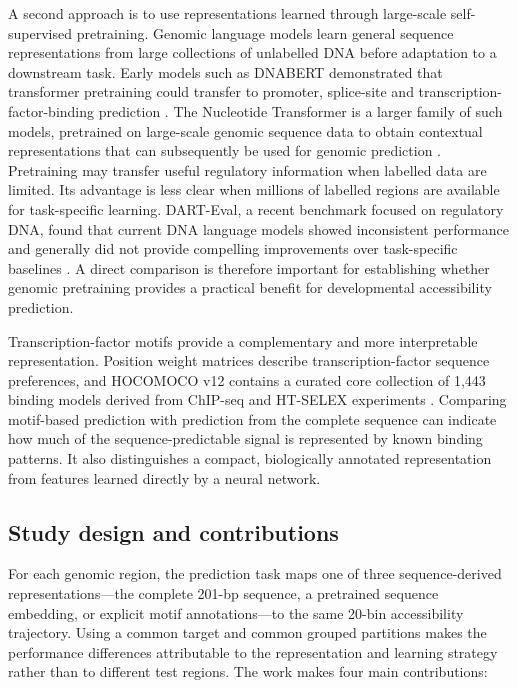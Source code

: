\documentclass[a4paper,12pt]{article}
\begin{document}
A second approach is to use representations learned through large-scale self-supervised pretraining. Genomic language models learn general sequence representations from large collections of unlabelled DNA before adaptation to a downstream task. Early models such as DNABERT demonstrated that transformer pretraining could transfer to promoter, splice-site and transcription-factor-binding prediction \citep{ji2021dnabert}. The Nucleotide Transformer is a larger family of such models, pretrained on large-scale genomic sequence data to obtain contextual representations that can subsequently be used for genomic prediction \citep{dallatorre2024nt}. Pretraining may transfer useful regulatory information when labelled data are limited. Its advantage is less clear when millions of labelled regions are available for task-specific learning. DART-Eval, a recent benchmark focused on regulatory DNA, found that current DNA language models showed inconsistent performance and generally did not provide compelling improvements over task-specific baselines \citep{patel2024darteval}. A direct comparison is therefore important for establishing whether genomic pretraining provides a practical benefit for developmental accessibility prediction.

Transcription-factor motifs provide a complementary and more interpretable representation. Position weight matrices describe transcription-factor sequence preferences, and HOCOMOCO v12 contains a curated core collection of 1,443 binding models derived from ChIP-seq and HT-SELEX experiments \citep{vorontsov2024hocomoco}. Comparing motif-based prediction with prediction from the complete sequence can indicate how much of the sequence-predictable signal is represented by known binding patterns. It also distinguishes a compact, biologically annotated representation from features learned directly by a neural network.

\subsection{Study design and contributions}

For each genomic region, the prediction task maps one of three sequence-derived representations---the complete 201-bp sequence, a pretrained sequence embedding, or explicit motif annotations---to the same 20-bin accessibility trajectory. Using a common target and common grouped partitions makes the performance differences attributable to the representation and learning strategy rather than to different test regions. The work makes four main contributions:
\end{document}
